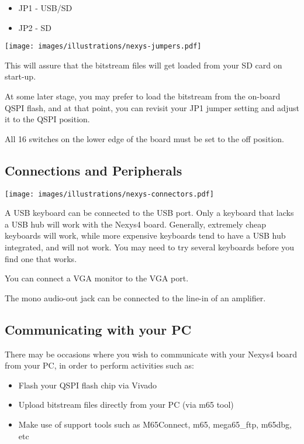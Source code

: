 \begin{itemize}
  \item{JP1} - USB/SD
  \item{JP2} - SD
\end{itemize}

\begin{center}
  \texttt{[image: images/illustrations/nexys-jumpers.pdf]}
\end{center}

This will assure that the bitstream files will get loaded from your SD card on start-up.

At some later stage, you may prefer to load the bitstream from the on-board QSPI flash, and at that point, you can revisit your JP1 jumper setting and adjust it to the QSPI position.


All 16 switches on the lower edge of the board must be set to the off position.


\subsection{Connections and Peripherals}

\texttt{[image: images/illustrations/nexys-connectors.pdf]}

A USB keyboard can be connected to the USB port. Only a keyboard that lacks a USB hub will work with the Nexys4 board.  Generally, extremely cheap keyboards will work, while more expensive keyboards tend to have a USB hub integrated, and will not work.  You may need to try several keyboards before you find one that works.

You can connect a VGA monitor to the VGA port.

The mono audio-out jack can be connected to the line-in of an amplifier.


\subsection{Communicating with your PC}

There may be occasions where you wish to communicate with your Nexys4 board from your PC, in order to perform activities such as:

\begin{itemize}
  \item Flash your QSPI flash chip via Vivado
  \item Upload bitstream files directly from your PC (via m65 tool)
  \item Make use of support tools such as M65Connect, m65, mega65\_ftp, m65dbg, etc
\end{itemize}

